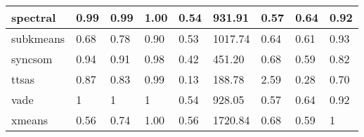 \begin{table}[H]
\begin{tabular}{|l|l|l|l|l|l|l|l|l|}
\hline
spectral & 0.99 & 0.99 & 1.00 & 0.54 & 931.91 & 0.57 & 0.64 & 0.92 \\
\hline
subkmeans & 0.68 & 0.78 & 0.90 & 0.53 & 1017.74 & 0.64 & 0.61 & 0.93 \\
\hline
syncsom & 0.94 & 0.91 & 0.98 & 0.42 & 451.20 & 0.68 & 0.59 & 0.82 \\
\hline
ttsas & 0.87 & 0.83 & 0.99 & 0.13 & 188.78 & 2.59 & 0.28 & 0.70 \\
\hline
vade & 1 & 1 & 1 & 0.54 & 928.05 & 0.57 & 0.64 & 0.92 \\
\hline
xmeans & 0.56 & 0.74 & 1.00 & 0.56 & 1720.84 & 0.68 & 0.59 & 1 \\
\hline
\end{tabular}
\end{table}